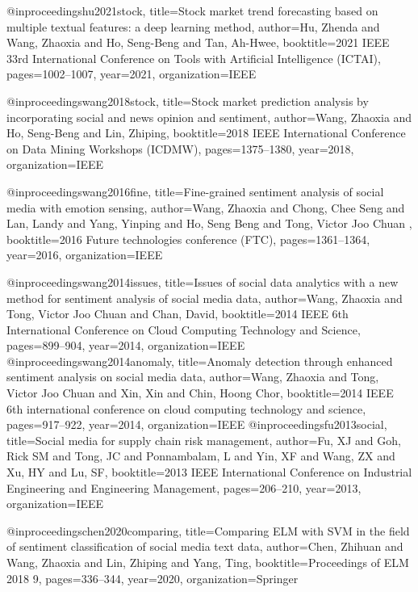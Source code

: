 @inproceedings{hu2021stock,
  title={Stock market trend forecasting based on multiple textual features: a deep learning method},
  author={Hu, Zhenda and Wang, Zhaoxia and Ho, Seng-Beng and Tan, Ah-Hwee},
  booktitle={2021 IEEE 33rd International Conference on Tools with Artificial Intelligence (ICTAI)},
  pages={1002--1007},
  year={2021},
  organization={IEEE}
}

@inproceedings{wang2018stock,
  title={Stock market prediction analysis by incorporating social and news opinion and sentiment},
  author={Wang, Zhaoxia and Ho, Seng-Beng and Lin, Zhiping},
  booktitle={2018 IEEE International Conference on Data Mining Workshops (ICDMW)},
  pages={1375--1380},
  year={2018},
  organization={IEEE}
}

@inproceedings{wang2016fine,
  title={Fine-grained sentiment analysis of social media with emotion sensing},
  author={Wang, Zhaoxia and Chong, Chee Seng and Lan, Landy and Yang, Yinping and Ho, Seng Beng and Tong, Victor Joo Chuan },
  booktitle={2016 Future technologies conference (FTC)},
  pages={1361--1364},
  year={2016},
  organization={IEEE}
}

@inproceedings{wang2014issues,
  title={Issues of social data analytics with a new method for sentiment analysis of social media data},
  author={Wang, Zhaoxia and Tong, Victor Joo Chuan and Chan, David},
  booktitle={2014 IEEE 6th International Conference on Cloud Computing Technology and Science},
  pages={899--904},
  year={2014},
  organization={IEEE}
}
@inproceedings{wang2014anomaly,
  title={Anomaly detection through enhanced sentiment analysis on social media data},
  author={Wang, Zhaoxia and Tong, Victor Joo Chuan and Xin, Xin and Chin, Hoong Chor},
  booktitle={2014 IEEE 6th international conference on cloud computing technology and science},
  pages={917--922},
  year={2014},
  organization={IEEE}
}
@inproceedings{fu2013social,
  title={Social media for supply chain risk management},
  author={Fu, XJ and Goh, Rick SM and Tong, JC and Ponnambalam, L and Yin, XF and Wang, ZX and Xu, HY and Lu, SF},
  booktitle={2013 IEEE International Conference on Industrial Engineering and Engineering Management},
  pages={206--210},
  year={2013},
  organization={IEEE}
}

@inproceedings{chen2020comparing,
  title={Comparing ELM with SVM in the field of sentiment classification of social media text data},
  author={Chen, Zhihuan and Wang, Zhaoxia and Lin, Zhiping and Yang, Ting},
  booktitle={Proceedings of ELM 2018 9},
  pages={336--344},
  year={2020},
  organization={Springer}
}

